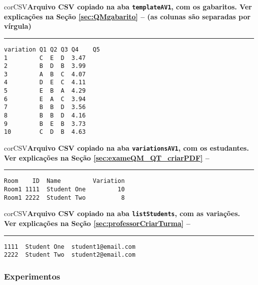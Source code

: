 \begin{myboxCode}{corCSV}{\textbf{Arquivo CSV copiado na aba \texttt{templateAV1}, com os gabaritos. Ver explicações na Seção \ref{sec:QMgabarito} --  (as colunas são separadas por vírgula)}}\vspace{3mm}
\hrule
{\footnotesize
\begin{verbatim}
variation Q1 Q2 Q3 Q4    Q5
1         C  E  D  3.47   
2         B  D  B  3.99  
3         A  B  C  4.07  
4         D  E  C  4.11  
5         E  B  A  4.29  
6         E  A  C  3.94  
7         B  B  D  3.56  
8         B  B  D  4.16  
9         B  E  B  3.73  
10        C  D  B  4.63  
\end{verbatim}
}
\end{myboxCode}


\begin{myboxCode}{corCSV}{\textbf{Arquivo CSV copiado na aba \texttt{variationsAV1}, com os estudantes. Ver explicações na Seção \ref{sec:exameQM_QT_criarPDF} -- }}\vspace{3mm}
\hrule
{\footnotesize
\begin{verbatim}
Room    ID  Name         Variation
Room1 1111  Student One         10
Room1 2222  Student Two          8
\end{verbatim}
}
\end{myboxCode}

\begin{myboxCode}{corCSV}{\textbf{Arquivo CSV copiado na aba \texttt{listStudents}, com as variações. Ver explicações na Seção \ref{sec:professorCriarTurma} -- }}\vspace{3mm}
\hrule
{\footnotesize
\begin{verbatim}
1111  Student One  student1@email.com
2222  Student Two  student2@email.com
\end{verbatim}
}
\end{myboxCode}


\subsubsection{Experimentos}

